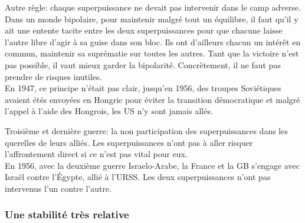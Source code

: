 \documentclass[10pt, a4paper, openany]{book}
\begin{document}
Autre règle: chaque superpuissance ne devait pas intervenir dans le camp adverse. Dans un monde bipolaire, pour maintenir malgré tout un équilibre, il faut qu'il y ait une entente tacite entre les deux superpuissances pour que chacune laisse l'autre libre d'agir à sa guise dans son bloc. Ils ont d'ailleurs chacun un intérêt en commun, maintenir sa suprématie sur toutes les autres. Tant que la victoire n'est pas possible, il vaut mieux garder la bipolarité. Concrètement, il ne faut pas prendre de risques inutiles. \\
En 1947, ce principe n'était pas clair, jusqu'en 1956, des troupes Soviétiques avaient étés envoyées en Hongrie pour éviter la transition démocratique et malgré l'appel à l'aide des Hongrois, les US n'y sont jamais allés. 


Troisième et dernière guerre: la non participation des superpuissances dans les querelles de leurs alliés. Les superpuissances n'ont pas à aller risquer l'affrontement direct si ce n'est pas vital pour eux. \\
En 1956, avec la deuxième guerre Israelo-Arabe, la France et la GB s'engage avec Israël contre l'Égypte, allié à l'URSS. Les deux superpuissances n'ont pas intervenus l'un contre l'autre. 

\subsubsection{Une stabilité très relative}
\end{document}
